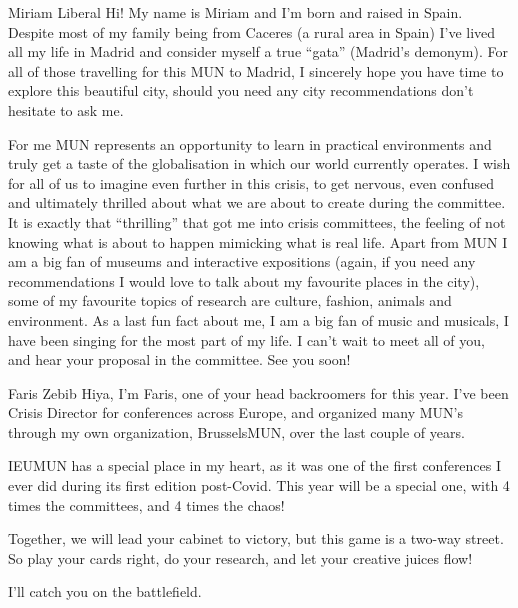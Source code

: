 \begin{chairletter}[Co-Chair]{Miriam Liberal}
Hi! My name is Miriam and I'm born and raised in Spain. Despite most of my family being from Caceres (a rural area in Spain) I've lived all my life in Madrid and consider myself a true “gata” (Madrid’s  demonym). For all of those travelling for this MUN to Madrid, I sincerely hope you have time to explore this beautiful city, should you need any city recommendations don't hesitate to ask me.

For me MUN represents an opportunity to learn in practical environments and truly get a taste of the globalisation in which our world currently operates. I wish for all of us to imagine even further in this crisis, to get nervous, even confused and ultimately thrilled about what we are about to create during the committee. It is exactly that “thrilling” that got me into crisis committees, the feeling of not knowing what is about to happen mimicking what is real life. Apart from MUN I am a big fan of museums and interactive expositions (again, if you need any recommendations I would love to talk about my favourite places in the city), some of my favourite topics of research are culture, fashion, animals and  environment. As a last fun fact about me, I am a big fan of music and musicals, I have been singing for the most part of my life. I can’t wait to meet all of you, and hear your proposal in the committee. See you soon!

\end{chairletter}

\begin{chairletter}{Faris Zebib}
Hiya, I’m Faris, one of your head backroomers for this year. I’ve been Crisis Director for conferences across Europe, and organized many MUN’s through my own organization, BrusselsMUN, over the last couple of years.

IEUMUN has a special place in my heart, as it was one of the first conferences I ever did during its first edition post-Covid. This year will be a special one, with 4 times the committees, and 4 times the chaos!

Together, we will lead your cabinet to victory, but this game is a two-way street. So play your cards right, do your research, and let your creative juices flow!

I’ll catch you on the battlefield.

\end{chairletter}

